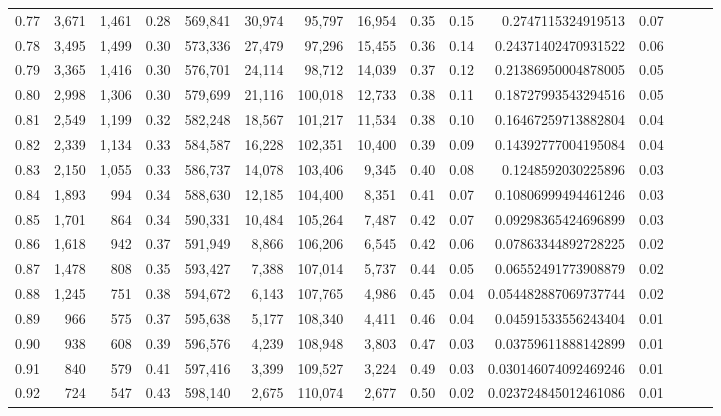 \begin{tabular}{rrrrrrrrrrrrrrr}
0.77 &   3,671 &  1,461 &  0.28 &  569,841 &   30,974 &   95,797 &   16,954 &  0.35 &  0.15 &    0.2747115324919513 &      0.07 \\
0.78 &   3,495 &  1,499 &  0.30 &  573,336 &   27,479 &   97,296 &   15,455 &  0.36 &  0.14 &   0.24371402470931522 &      0.06 \\
0.79 &   3,365 &  1,416 &  0.30 &  576,701 &   24,114 &   98,712 &   14,039 &  0.37 &  0.12 &   0.21386950004878005 &      0.05 \\
0.80 &   2,998 &  1,306 &  0.30 &  579,699 &   21,116 &  100,018 &   12,733 &  0.38 &  0.11 &   0.18727993543294516 &      0.05 \\
0.81 &   2,549 &  1,199 &  0.32 &  582,248 &   18,567 &  101,217 &   11,534 &  0.38 &  0.10 &   0.16467259713882804 &      0.04 \\
0.82 &   2,339 &  1,134 &  0.33 &  584,587 &   16,228 &  102,351 &   10,400 &  0.39 &  0.09 &   0.14392777004195084 &      0.04 \\
0.83 &   2,150 &  1,055 &  0.33 &  586,737 &   14,078 &  103,406 &    9,345 &  0.40 &  0.08 &    0.1248592030225896 &      0.03 \\
0.84 &   1,893 &    994 &  0.34 &  588,630 &   12,185 &  104,400 &    8,351 &  0.41 &  0.07 &   0.10806999494461246 &      0.03 \\
0.85 &   1,701 &    864 &  0.34 &  590,331 &   10,484 &  105,264 &    7,487 &  0.42 &  0.07 &   0.09298365424696899 &      0.03 \\
0.86 &   1,618 &    942 &  0.37 &  591,949 &    8,866 &  106,206 &    6,545 &  0.42 &  0.06 &   0.07863344892728225 &      0.02 \\
0.87 &   1,478 &    808 &  0.35 &  593,427 &    7,388 &  107,014 &    5,737 &  0.44 &  0.05 &   0.06552491773908879 &      0.02 \\
0.88 &   1,245 &    751 &  0.38 &  594,672 &    6,143 &  107,765 &    4,986 &  0.45 &  0.04 &  0.054482887069737744 &      0.02 \\
0.89 &     966 &    575 &  0.37 &  595,638 &    5,177 &  108,340 &    4,411 &  0.46 &  0.04 &   0.04591533556243404 &      0.01 \\
0.90 &     938 &    608 &  0.39 &  596,576 &    4,239 &  108,948 &    3,803 &  0.47 &  0.03 &   0.03759611888142899 &      0.01 \\
0.91 &     840 &    579 &  0.41 &  597,416 &    3,399 &  109,527 &    3,224 &  0.49 &  0.03 &  0.030146074092469246 &      0.01 \\
0.92 &     724 &    547 &  0.43 &  598,140 &    2,675 &  110,074 &    2,677 &  0.50 &  0.02 &  0.023724845012461086 &      0.01 \\

\end{tabular}
